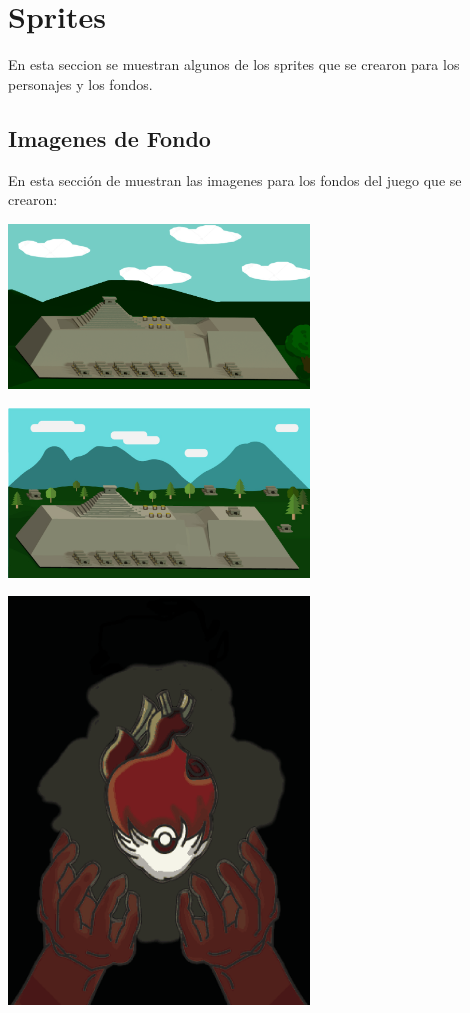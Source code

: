 \section{Sprites}\label{SpriteDic}
En esta seccion se muestran algunos de los sprites que se crearon para los 
personajes y los fondos. 
\subsection{Imagenes de Fondo}
En esta sección de muestran las imagenes para los fondos del juego que se crearon:
\\
\par
\begin{center}
\includegraphics[width=0.6\textwidth]{09Anexos/sprites/fondo02}
\end{center}

\begin{center}
\includegraphics[width=0.6\textwidth]{09Anexos/sprites/fondo-Mont}
\end{center}

\begin{center}
\includegraphics[width=0.6\textwidth]{09Anexos/sprites/yolotl_logo}
\end{center}

